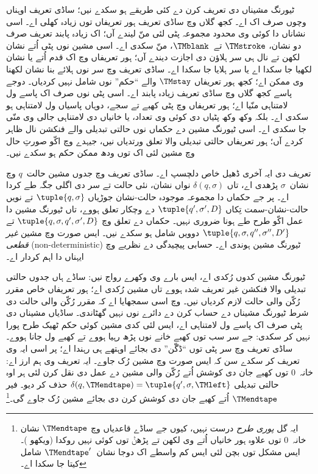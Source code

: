 \documentclass[../../../include/open-logic-section]{subfiles}
\begin{document}

ٹیورنگ مشیناں دی تعریف کرن دے کئی طریقے
ہو سکدے نیں؛ ساڈی تعریف اوہناں وچوں
صرف اک اے۔ کجھ گلاں وچ ساڈی تعریف
ہور تعریفاں توں زیادہ کھلی اے۔ اسی
نشاناں دا کوئی وی محدود مجموعہ پٹی
لئی منّ لیندے آں؛ اک زیادہ پابند تعریف
صرف دو نشان، $\TMstroke$
تے~$\TMblank$، منّ سکدی اے۔ اسی
مشین نوں پٹی اُتے نشان لکھن تے
نال ہی سر ہلاؤن دی اجازت دیندے آں؛
ہور تعریفاں وچ اک قدم اُتے
یا نشان لکھیا جا سکدا اے یا سر ہلایا جا سکدا اے۔
ساڈی تعریف وچ سر نوں ہلائے بنا
نشان لکھنا وی ممکن اے؛ کجھ ہور
تعریفاں $\TMstay$ والے “حکم” نوں
شامل نہیں کردیاں۔ دوجے پاسے کجھ
گلاں وچ ساڈی تعریف زیادہ پابند اے۔
اسی پٹی نوں صرف اک پاسے ول
لامتناہی منّیا اے؛ ہور تعریفاں وچ
پٹی کھبے تے سجے، دوہاں پاسیاں
ول لامتناہی ہو سکدی اے۔ بلکہ
وکھ وکھ پٹیاں دی کوئی وی تعداد،
یا خانیاں دی لامتناہی جالی وی
منّی جا سکدی اے۔ اسی ٹیورنگ
مشین دے حکماں نوں حالتی تبدیلی
والے فنکشن نال ظاہر کردے آں؛
ہور تعریفاں حالتی تبدیلی والا
تعلق ورتدیاں نیں، جیہدے وچ اکّو
صورتِ حال وچ مشین لئی اک توں
ودھ ممکن حکم ہو سکدے نیں۔

تعریف دی ایہ آخری ڈھیل خاص دلچسپ اے۔
ساڈی تعریف وچ جدوں مشین حالت~$q$
وچ نشان~$\sigma$ پڑھدی اے،
تاں $\delta(q, \sigma)$ نواں نشان،
نئی حالت تے سر دی اگلی جگہ
طے کردا اے۔ پر جے حکماں
دا مجموعہ موجودہ حالت-نشان
جوڑیاں $\tuple{q,
  \sigma}$ تے نویں حالت-نشان-سمت
تِکاں $\tuple{q', \sigma',
  D}$ دے وچکار تعلق ہووے،
تاں ٹیورنگ مشین دا عمل
اکّو طرح طے ہونا ضروری
نہیں۔ حکماں دے تعلق وچ
$\tuple{q,
  \sigma, q', \sigma', D}$ تے
$\tuple{q, \sigma, q'', \sigma'', D'}$
دوویں شامل ہو سکدے نیں۔
ایس صورت وچ مشین
\emph{غیر قطعی} (non-deterministic)
ٹیورنگ مشین ہوندی اے۔
حسابی پیچیدگی دے نظریے وچ
ایہناں دا اہم کردار اے۔

ٹیورنگ مشین کدوں رُکدی اے،
ایس بارے وی وکھرے رواج نیں:
ساڈے ہاں جدوں حالتی تبدیلی
والا فنکشن غیر تعریف شدہ ہووے
تاں مشین رُکدی اے؛ ہور تعریفاں
خاص مقرر رُکّن والی حالت
لازم کردیاں نیں۔ 
وچ اسی سمجھایا اے کہ مقرر
رُکّن والی حالت دی شرط
ٹیورنگ مشیناں دے حساب کرن
دے دائرے نوں نہیں گھٹاندی۔
ساڈیاں مشیناں دی پٹی صرف
اک پاسے ول لامتناہی اے،
ایس لئی کدی مشین کوئی
حکم ٹھیک طرح پورا نہیں
کر سکدی: جے سر سب توں
کھبے خانے نوں پڑھ رہیا
ہووے تے کھبے ول جانا
ہووے۔ ساڈی تعریف وچ سر
پٹی توں “ڈگّن” دی بجائے
اوہتھے ہی رہندا اے؛ پر
اسی ایہ وی تعریف کر سکدے
سن کہ ایس صورت وچ مشین
رُک جاوے۔ ایہ تعریف وی
ہم ارز اے: خانہ~$0$ توں
کھبے جان دی کوشش اُتے
رُکّن والی مشین دے عمل
دی نقل کرن لئی ہر اوہ
حالتی تبدیلی
$\delta(q,\TMendtape) =
\tuple{q',\sigma,\TMleft}$
حذف کر دیو۔ فیر
$\TMendtape$ اُتے کھبے
جان دی کوشش کرن دی
بجائے مشین رُک جاوے
گی۔\footnote{ایہ گل
\emph{پوری طرح} درست نہیں،
کیوں جے ساڈے قاعدیاں
وچ $\TMendtape$ نشان
خانہ~$0$ توں
علاوہ ہور خانیاں اُتے
وی لکھن
تے پڑھݨ توں کوئی
نہیں روکدا
(ویکھو )۔
ایس مشکل توں بچن لئی
ایس کم واسطے اک دوجا
نشان~$\TMendtape'$
شامل کیتا جا سکدا اے۔}
\end{document}
